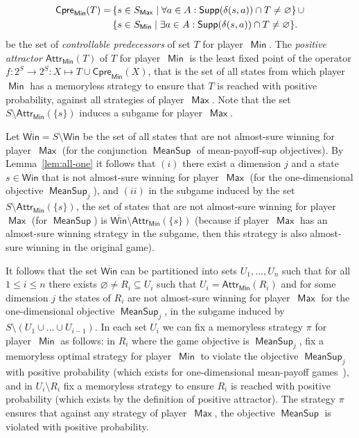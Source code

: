 \documentclass{article}
\let\emptyset\varnothing
\newcommand{\Supp}{{\sf Supp}}
\newcommand{\PP}{\delta}
\newcommand{\Win}{\mathsf{Win}}
\newcommand{\cpremi}{\mathsf{Cpre}_{\mi}}
\newcommand{\atmi}{\mathsf{Attr}_{\mi}}
\newcommand{\strab}{\pi}
\DeclareMathOperator{\ma}{\mathsf{Max}}
\DeclareMathOperator{\mi}{\mathsf{Min}}
\newcommand{\MeanSup}{\operatorname{\mathsf{MeanSup}}}
\begin{document}
\begin{align*}
\cpremi(T) =\, & \{s \in S_{\ma} \mid \forall a \in A: \Supp(\PP(s,a)) \cap T \neq \emptyset \}\, \cup \\
             & \{s \in S_{\mi} \mid \exists a \in A: \Supp(\PP(s,a)) \cap T \neq \emptyset \}.
\end{align*}
be the set of \emph{controllable predecessors} of set $T$ for player~$\mi$.
The \emph{positive attractor} $\atmi(T)$ of $T$ for player~$\mi$ is the least 
fixed point of the operator $f: 2^S \to 2^S: X \mapsto T \cup \cpremi(X)$,
that is the
set of all states from which player~$\mi$ has a memoryless strategy to ensure that $T$ is reached
with positive probability, against all strategies of player~$\ma$.
Note that the set $S \setminus \atmi(\{s\})$ induces a subgame for player~$\ma$.



Let $\overline{\Win} = S \setminus \Win$ be the set of all states 
that are not almost-sure winning for player~$\ma$ (for the conjunction
$\MeanSup$ of mean-payoff-sup objectives). 
By Lemma~\ref{lem:all-one} it follows that $(i)$ there exist a dimension $j$ and 
a state $s \in \overline{\Win}$ that is not almost-sure winning for player~$\ma$ 
(for the one-dimensional objective $\MeanSup_j$), and $(ii)$ in the subgame induced by the set 
$S \setminus \atmi(\{s\})$, the set of states that are not almost-sure winning 
for player~$\ma$ (for $\MeanSup$) is $\overline{\Win} \setminus \atmi(\{s\})$
(because if player~$\ma$ has an almost-sure winning strategy in the subgame, 
then this strategy is also almost-sure winning in the original game).

It follows that the set $\overline{\Win}$ can be partitioned into sets $U_1, \dots, U_n$
such that for all $1 \leq i \leq n$ there exists $\emptyset \neq R_i \subseteq U_i$ such that 
$U_i = \atmi(R_i)$ and for some dimension $j$ 
the states of $R_i$ are not almost-sure winning for player~$\ma$ for the one-dimensional objective $\MeanSup_j$,
in the subgame induced by $S \setminus (U_1 \cup \dots \cup U_{i-1})$.
In each set $U_i$ we can fix a memoryless strategy $\strab$ for player~$\mi$ as follows:
in $R_i$ where the game objective is $\MeanSup_j$, fix a memoryless optimal 
strategy for player~$\mi$ to violate the objective $\MeanSup_j$ with positive probability 
(which exists for one-dimensional mean-payoff games~\cite{LigLip69}), 
and in $U_i \setminus R_i$ fix a memoryless strategy to ensure $R_i$ is reached with 
positive probability (which exists by the definition of positive attractor).
The strategy $\strab$ ensures that against any strategy of player~$\ma$, the
objective $\MeanSup$ is violated with positive probability. 
\end{document}
